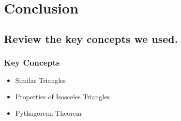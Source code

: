 \documentclass{beamer} %
\begin{document}

\section{Conclusion}

\subsection*{Review the key concepts we used.}

\begin{frame}
  \frametitle{Key Concepts}
  \pause
  \begin{itemize}
  \item Similar Triangles \pause
  \item Properties of Isosceles Triangles \pause
  \item Pythagorean Theorem
  \end{itemize}
\end{frame}

\begin{comment}
\subsection*{A message from Tim.}

\tcbset{colframe=ml3}

\begin{frame}
\begin{center}
\begin{figure}
\tcbox{\texttt{[image: sanders.png]}}
``Hi everybody, this is Tim.''
\end{figure}
\end{center}
\end{frame}
\end{comment}
\end{document}
